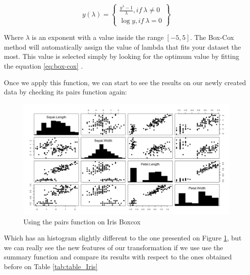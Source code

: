 \begin{equation}
\label{eq:box-cox}
 {y(\lambda)=} \left\{
 \begin{aligned}
        \frac{y^{\lambda} - 1}{\lambda} ,  if \  \lambda \neq 0\\
        {\log y}, if \ \lambda = 0
       \end{aligned}
 \right\}
 \end{equation} 
\newline

Where $\lambda$ is an exponent with a value inside the range $[-5,5]$. The Box-Cox method will automatically assign the value of lambda that fits your dataset the most. This value is selected simply by looking for the optimum value by fitting the equation \ref{eq:box-cox} . \par

Once we apply this function, we can start to see the results on our newly created data by checking its pairs function again:

\begin{figure}[H]
	\centering
	\includegraphics[width=17cm]{Figuras_tfg/Figure_Boxcox}
	\caption{Using the pairs function on Iris Boxcox}
	\label{fig:figure_pairs_iris_bc}
\end{figure}

Which has an histogram slightly different to the one presented on Figure \ref{fig:figure_pairs_iris_bc}, but we can really see the new features of our transformation if we use use the summary function and compare its results with respect to the ones obtained before on Table \ref{tab:table_Iris}
\newline

